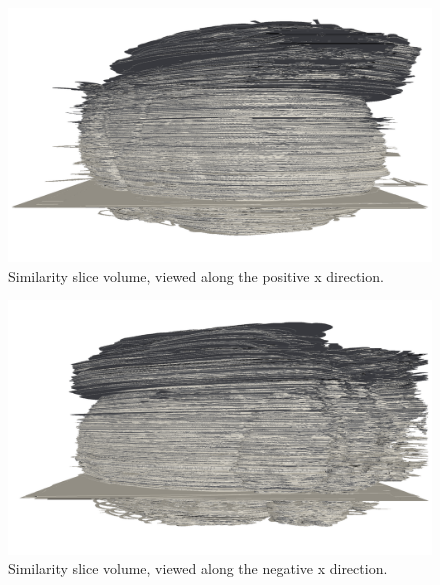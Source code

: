 	\begin{figure}
	  \centering
	  \includegraphics[width=0.9\textheight]{Ch7/Figs/Rat28/contours/whole_positive_x_size}
	  \caption{Similarity slice volume, viewed along the positive x direction.}
	  \label{fig:positive_x_similarity_contour}
	\end{figure}

	\begin{figure}
	  \centering
	  \includegraphics[width=0.9\textheight]{Ch7/Figs/Rat28/contours/whole_negative_x_size}
	  \caption{Similarity slice volume, viewed along the negative x direction.}
	  \label{fig:negative_x_similarity_contour}
	\end{figure}

